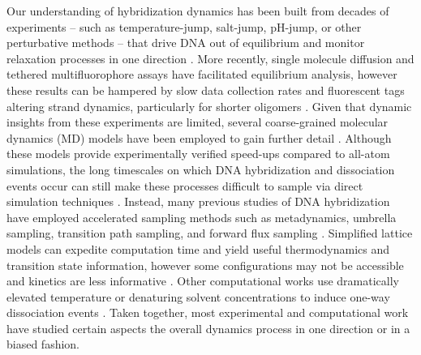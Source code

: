 \documentclass[journal=jpcbfk,manuscript=article]{achemso}
\begin{document}
Our understanding of hybridization dynamics has been built from decades of experiments -- such as temperature-jump, salt-jump, pH-jump, or other perturbative methods -- that drive DNA out of equilibrium and monitor relaxation processes in one direction \citep{Morrison1993SensitiveSolution, Wetmur1968KineticsDNA, Craig1971ElaxationOligon, Porschke1973ThermodynamicsPairs, Williams1989LaserDGCATGC, Narayanan2012ExploringMixing, Chen2007InfluenceHybridization, Sanstead2018DirectDehybridization}. More recently, single molecule diffusion and tethered multifluorophore assays have facilitated equilibrium analysis, however these results can be hampered by slow data collection rates and fluorescent tags altering strand dynamics, particularly for shorter oligomers \citep{Liu20173DSolution,  Schickinger2018TetheredHelices, Chen2008Base-by-baseSpectroscopy, Dupuis2013Single-moleculeHelices, Morrison1993SensitiveSolution}. Given that dynamic insights from these experiments are limited, several coarse-grained molecular dynamics (MD) models have been employed to gain further detail \citep{Romano2013DNADependence, Hinckley2013AnHybridization, Maciejczyk2014DNAModel, Markegard2015}. Although these models provide experimentally verified speed-ups compared to all-atom simulations, the long timescales on which DNA hybridization and dissociation events occur can still make these processes difficult to sample via direct simulation techniques \citep{Phys2014}. Instead, many previous studies of DNA hybridization have employed accelerated sampling methods such as metadynamics, umbrella sampling,  transition path sampling, and forward flux sampling \citep{Schmitt2013ExploringSurface, Sambriski2009,  Hoefert2011MolecularOligonucleotides, Romano2013DNADependence}. Simplified lattice models can expedite computation time and yield useful thermodynamics and transition state information, however some configurations may not be accessible and kinetics are less informative \citep{Araque2016LatticeCooperativity, Phys2019}. Other computational works use dramatically elevated temperature or denaturing solvent concentrations to induce one-way dissociation events \citep{Wong2008TheSimulations, Perez2010Real-timeUnfolding}. Taken together, most experimental and computational work have studied certain aspects the overall dynamics process in one direction or in a biased fashion.
\end{document}
